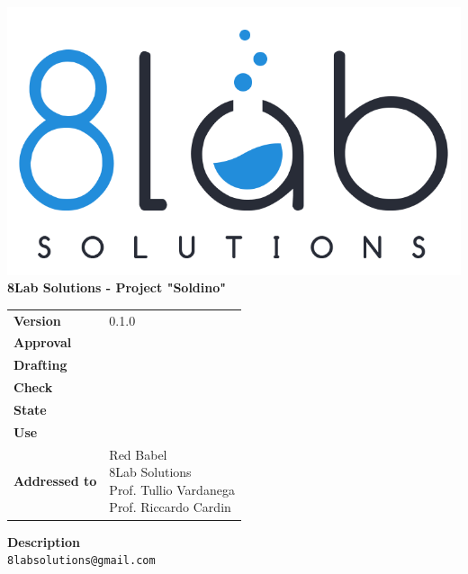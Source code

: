 \thispagestyle{empty}
\begin{titlepage}
	\begin{center}
		\includegraphics[scale = 0.3]{res/images/logo8_crop.png}\\
		\large \textbf{8Lab Solutions - Project "Soldino"} \\
		\vfill
		\Huge \textbf{\doctitle}
		\vspace*{\fill}
        
        \vfill
        \large
    \end{center}
	\begin{table}[htbp]
        \centering
        \hspace*{2cm}
        \begin{tabular}{l|l}
            \textbf{Version} & 0.1.0 \\%
            \textbf{Approval} & \\%
            \textbf{Drafting} & \red{} \\
            \textbf{Check} & \ver{} \\
            \textbf{State} & \stato{} \\
            \textbf{Use} & \uso{} \\
            \textbf{Addressed to} & \parbox[t]{5cm}{Red Babel \\8Lab Solutions
            \\Prof. Tullio Vardanega\\Prof. Riccardo Cardin}
        \end{tabular}
    \end{table}
    \begin{center}
        \vfill
        \normalsize
        \textbf{Description}\\
		\describedoc
        \vfill
        \small
        \texttt{8labsolutions@gmail.com}
	\end{center}
\end{titlepage}
